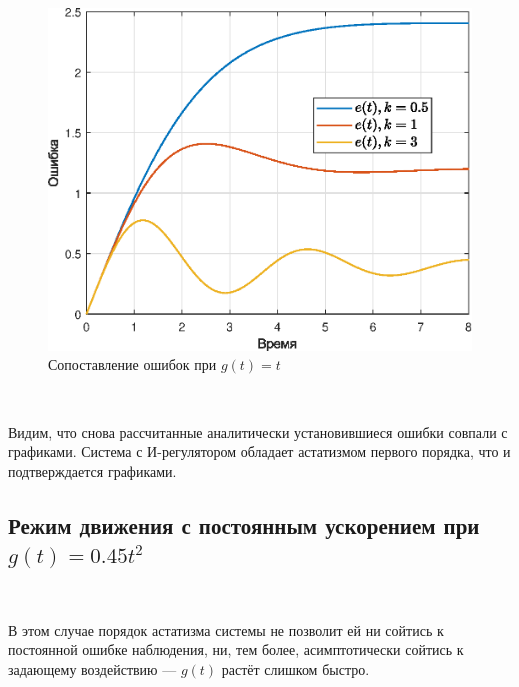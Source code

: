 \documentclass[a4paper]{article}
\begin{document}
\begin{figure}[H]
    \centering
    \includegraphics[width=0.55\linewidth]{ex4/all_g_vt_error.eps}
    \caption{Сопоставление ошибок при $g(t)=t$}
\end{figure}\

Видим, что снова рассчитанные аналитически установившиеся ошибки совпали с графиками. Система с И-регулятором обладает астатизмом первого порядка, что и подтверждается графиками.

\subsection{Режим движения с постоянным ускорением при $g(t) = 0.45t^2$}\

В этом случае порядок астатизма системы не позволит ей ни сойтись к постоянной ошибке наблюдения, ни, тем более, асимптотически сойтись к задающему воздействию --- $g(t)$ растёт слишком быстро.\ 
\end{document}
